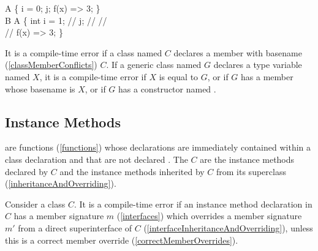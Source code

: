 \documentclass[makeidx]{article}
\begin{document}

\begin{dartCode}
\CLASS{} A \{
  \VAR{} i = 0;
  \VAR{} j;
  f(x) => 3;
\}
\\
\CLASS{} B \EXTENDS{} A \{
  int i = 1; // 
  \STATIC{} j; // 
  // 
\\
  // 
  \STATIC{} f(x) => 3;
\}
\end{dartCode}

\LMHash{}%
It is a compile-time error if a class named $C$ declares
a member with basename (\ref{classMemberConflicts}) $C$.
If a generic class named $G$ declares a type variable named $X$,
it is a compile-time error
if $X$ is equal to $G$,
or if $G$ has a member whose basename is $X$,
or if $G$ has a constructor named .


\subsection{Instance Methods}

\LMHash{}%
are functions (\ref{functions})
whose declarations are immediately contained within a class declaration
and that are not declared \STATIC{}.
The  $C$ are the instance methods declared by $C$
and the instance methods inherited by $C$ from its superclass
(\ref{inheritanceAndOverriding}).

\LMHash{}%
Consider a class $C$.
It is a compile-time error if an instance method declaration in $C$ has
a member signature $m$
(\ref{interfaces})
which overrides a member signature $m'$
from a direct superinterface of $C$
(\ref{interfaceInheritanceAndOverriding}),
unless this is a correct member override
(\ref{correctMemberOverrides}).

\end{document}
